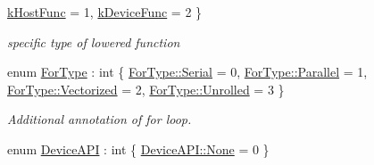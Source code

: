 \begin{DoxyCompactItemize}
\hyperlink{namespacetvm_1_1tir_a69f0089a367b98e377b652186fa7dc66acf71d9235254aaaf4856732d6f743858}{k\+Host\+Func} = 1, 
\hyperlink{namespacetvm_1_1tir_a69f0089a367b98e377b652186fa7dc66a6280765ba977e1b1b059d48dd508a628}{k\+Device\+Func} = 2
 \}\begin{DoxyCompactList}\small\item\em specific type of lowered function \end{DoxyCompactList}
\item 
enum \hyperlink{namespacetvm_1_1tir_ae35cce8e3f1e8d7366dc0d9b15536736}{For\+Type} \+: int \{ \hyperlink{namespacetvm_1_1tir_ae35cce8e3f1e8d7366dc0d9b15536736a5255d3daaa0a6276b844d61401e6f493}{For\+Type\+::\+Serial} = 0, 
\hyperlink{namespacetvm_1_1tir_ae35cce8e3f1e8d7366dc0d9b15536736a98402eecfbcefc336954458a01752131}{For\+Type\+::\+Parallel} = 1, 
\hyperlink{namespacetvm_1_1tir_ae35cce8e3f1e8d7366dc0d9b15536736a138bc087eaaaf426b54f9a466f0cc725}{For\+Type\+::\+Vectorized} = 2, 
\hyperlink{namespacetvm_1_1tir_ae35cce8e3f1e8d7366dc0d9b15536736ae53597647de81f4cc9e098fc119ba0ac}{For\+Type\+::\+Unrolled} = 3
 \}\begin{DoxyCompactList}\small\item\em Additional annotation of for loop. \end{DoxyCompactList}
\item 
enum \hyperlink{namespacetvm_1_1tir_aed067b57db2923a07913239b2165e019}{Device\+A\+PI} \+: int \{ \hyperlink{namespacetvm_1_1tir_aed067b57db2923a07913239b2165e019a6adf97f83acf6453d4a6a4b1070f3754}{Device\+A\+P\+I\+::\+None} = 0
 \}
\end{DoxyCompactItemize}
